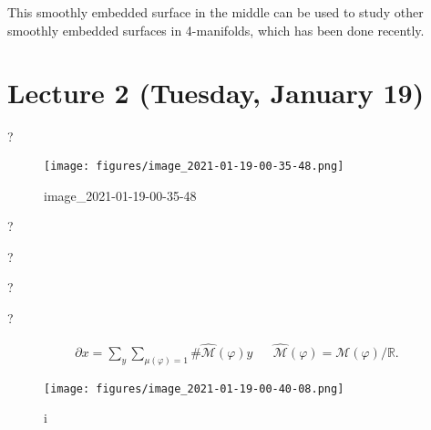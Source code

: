 \begin{remark}

This smoothly embedded surface in the middle can be used to study other
smoothly embedded surfaces in 4-manifolds, which has been done recently.

\end{remark}

\hypertarget{lecture-2-tuesday-january-19}{%
\section{Lecture 2 (Tuesday, January
19)}\label{lecture-2-tuesday-january-19}}

\begin{definition}

?

\begin{figure}
\centering
\texttt{[image: figures/image\_2021-01-19-00-35-48.png]}
\caption{image\_2021-01-19-00-35-48}
\end{figure}

\end{definition}

\begin{definition}

?

\end{definition}

\begin{definition}

?

\end{definition}

\begin{definition}

?

\end{definition}

\begin{definition}[Lagrangian]

?

\end{definition}

\begin{align*}
{{\partial}}x = \sum_y \sum_{\mu(\varphi) = 1} \# \widehat{\mathcal{M}} (\varphi)y &&  \widehat{\mathcal{M}}(\varphi) = \mathcal{M}(\varphi) / {\mathbb{R}}
.\end{align*}

\begin{figure}
\centering
\texttt{[image: figures/image\_2021-01-19-00-40-08.png]}
\caption{i}
\end{figure}


